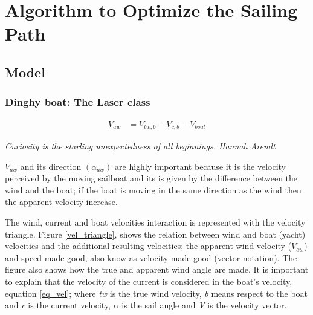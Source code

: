 \chapter{Algorithm to Optimize the Sailing Path}

\section{Model}
\subsection{Dinghy boat: The Laser class}

\begin{equation}
\label{eq_vel}
\begin{aligned}
V_{aw} & = V_{tw,b} - V_{c,b} - V_{boat}
\end{aligned}
\end {equation}

\textit{Curiosity is the starling unexpectedness of all beginnings. Hannah Arendt}\par  \noindent 

$V_{aw}$ and its direction $( \alpha_{aw})$ are highly important because it is the velocity perceived by the moving sailboat and its is given by the difference between the wind and the boat; if the boat is moving in the same direction as the wind then the apparent velocity increase. \par 

The wind, current and boat velocities interaction is represented with the velocity triangle.  Figure \ref{vel_triangle}, shows the relation between wind and boat (yacht) velocities and the additional resulting velocities; the apparent wind velocity ($V_{aw}$) and speed made good,  also know as velocity made good (vector notation). The figure also shows how the true and apparent wind angle are made. It is important to explain that the velocity of the current is considered in the boat's velocity, equation \ref{eq_vel}; where \textit{tw} is the true wind velocity, \textit{b} means respect to the boat and \textit{c} is the current velocity, $\alpha$ is the sail angle and \textit{V} is the velocity vector. \par